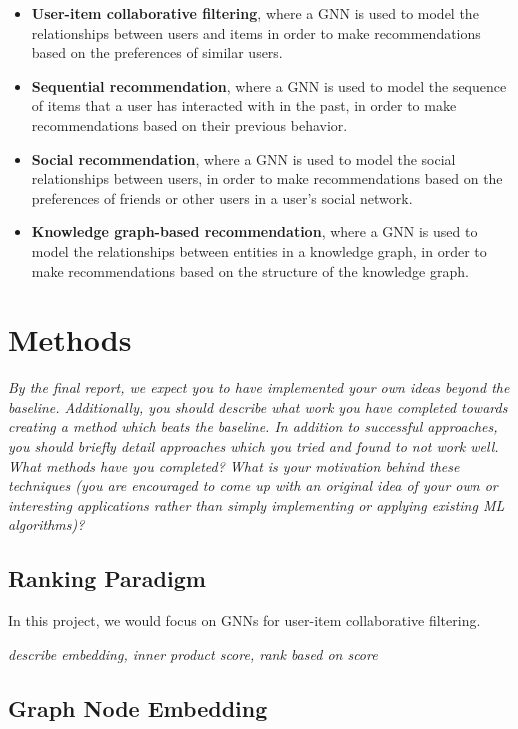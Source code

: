 \documentclass{article}
\begin{document}
\begin{itemize}
    \item \textbf{User-item collaborative filtering}, where a GNN is used to model the relationships between users and items in order to make recommendations based on the preferences of similar users.
    \item \textbf{Sequential recommendation}, where a GNN is used to model the sequence of items that a user has interacted with in the past, in order to make recommendations based on their previous behavior.
    \item \textbf{Social recommendation}, where a GNN is used to model the social relationships between users, in order to make recommendations based on the preferences of friends or other users in a user's social network.
    \item \textbf{Knowledge graph-based recommendation}, where a GNN is used to model the relationships between entities in a knowledge graph, in order to make recommendations based on the structure of the knowledge graph.
\end{itemize}

\section{Methods}
\textit{By the final report, we expect you to have implemented your own ideas beyond the baseline. Additionally, you should describe what work you have completed towards creating a method which beats the
baseline. In addition to successful approaches, you should briefly detail approaches which you tried and found to not work well. What methods have you completed? What is your motivation behind these techniques (you are encouraged to come up with an original idea of your own or interesting applications rather than simply implementing or applying existing ML algorithms)?}



\subsection{Ranking Paradigm}

In this project, we would focus on GNNs for user-item collaborative filtering. 

\textit{describe embedding, inner product score, rank based on score}


\subsection{Graph Node Embedding}
\end{document}
